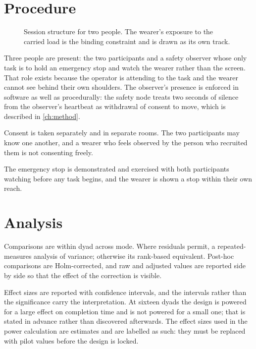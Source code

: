 \section{Procedure}

\begin{figure}[htbp]
  \centering
  
  \caption[Session timeline]{Session structure for two people. The wearer's
  exposure to the carried load is the binding constraint and is drawn as its
  own track.}
  \label{fig:timeline}
\end{figure}

Three people are present: the two participants and a safety observer whose
only task is to hold an emergency stop and watch the wearer rather than the
screen. That role exists because the operator is attending to the task and the
wearer cannot see behind their own shoulders. The observer's presence is
enforced in software as well as procedurally: the safety node treats two
seconds of silence from the observer's heartbeat as withdrawal of consent to
move, which is described in \cref{ch:method}.

Consent is taken separately and in separate rooms. The two participants may
know one another, and a wearer who feels observed by the person who recruited
them is not consenting freely.

The emergency stop is demonstrated and exercised with both participants
watching before any task begins, and the wearer is shown a stop within their
own reach.

\section{Analysis}

Comparisons are within dyad across mode. Where residuals permit, a
repeated-measures analysis of variance; otherwise its rank-based equivalent.
Post-hoc comparisons are Holm-corrected, and raw and adjusted values are
reported side by side so that the effect of the correction is visible.

Effect sizes are reported with confidence intervals, and the intervals rather
than the significance carry the interpretation. At sixteen dyads the design is powered for a large effect on completion time
and is not powered for a small one; that is stated in advance rather than
discovered afterwards. The effect sizes used in the power calculation are
estimates and are labelled as such: they must be replaced with pilot values
before the design is locked.

